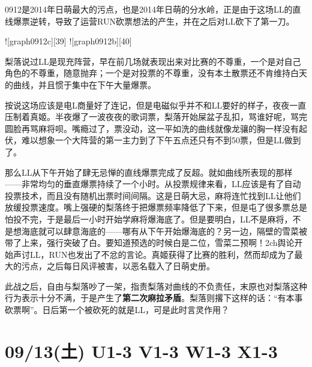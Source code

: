 0912是2014年日萌最大的污点，也是2014年日萌的分水岭，正是由于这场LL的直线爆票逆转，导致了运营RUN砍票想法的产生，并在之后对LL砍下了第一刀。

![graph0912c][39]
![graph0912b][40]

梨落说过LL是现充阵营，早在前几场就表现出来对比赛的不尊重，一个是对自己角色的不尊重，随意抛弃；一个是对投票的不尊重，没有本土散票还不肯维持白天的曲线，并且惯于集中在下午大量爆票。

按说这场应该是电L商量好了连记，但是电磁似乎并不和LL要好的样子，夜夜一直压制着真姬。半夜爆了一波夜夜的歌词票，梨落开始屎盆子乱扣，骂谁好呢，骂完圆脸再骂麻将呗。嘴瘾过了，票没动，这一平如洗的曲线就像龙骧的胸一样没有起伏，难以想象一个大阵营的第一主力到了下午五点还只有不到50票，但是LL做到了。

那么LL从下午开始了肆无忌惮的直线爆票完成了反超。就如曲线所表现的那样——非常均匀的垂直爆票持续了一个小时。从投票规律来看，LL应该是有了自动投票技术，而且没有随机出票时间间隔。这是日萌大忌，麻将连忙找到LL让他们放缓投票速度。嘴上强硬的梨落终于把爆票频率降低了下来，但是屯了很多票总是怕投不完，于是最后一小时开始学麻将爆海底了。但是要明白，LL不是麻将，不是想海底就可以肆意海底的——哪有从下午开始爆海底的？另一边，隔壁的雪菜被带了上来，强行突破了白。要知道预选的时候白是二位，雪菜二预啊！2ch舆论开始声讨LL，RUN也发出了不忿的言论。真姬获得了比赛的胜利，然而却成为了最大的污点，之后每日风评被害，以恶名载入了日萌史册。

此战之后，自由与梨落吵了一架，指责梨落对曲线的不负责任，末原也对梨落这种行为表示十分不满，于是产生了\textbf{第二次麻拉矛盾}。梨落则撂下这样的话：“有本事砍票啊”。日后第一个被砍死的就是LL，可是此时言灵作用？

\section{09/13(土) U1-3 V1-3 W1-3 X1-3}


